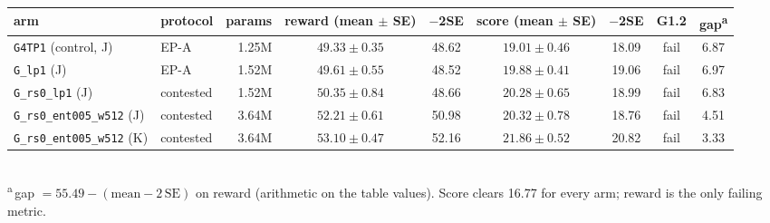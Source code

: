 \documentclass[10pt,a4paper]{article}
\newcommand{\p}[1]{\texttt{\small #1}}
\begin{document}
\begin{center}\small
\begin{tabular}{@{}p{3.6cm}lrcccccc@{}}\toprule
arm & protocol & params & reward (mean $\pm$ SE) & $-$2SE & score (mean $\pm$ SE) & $-$2SE & G1.2 & gap\textsuperscript{a}\\\midrule
\p{G4TP1} (control, J) & EP-A & 1.25M & $49.33\pm0.35$ & 48.62 & $19.01\pm0.46$ & 18.09 & fail & 6.87\\
\p{G\_lp1} (J) & EP-A & 1.52M & $49.61\pm0.55$ & 48.52 & $19.88\pm0.41$ & 19.06 & fail & 6.97\\
\p{G\_rs0\_lp1} (J) & contested & 1.52M & $50.35\pm0.84$ & 48.66 & $20.28\pm0.65$ & 18.99 & fail & 6.83\\
\p{G\_rs0\_ent005\_w512} (J) & contested & 3.64M & $52.21\pm0.61$ & 50.98 & $20.32\pm0.78$ & 18.76 & fail & 4.51\\
\p{G\_rs0\_ent005\_w512} (K) & contested & 3.64M & $53.10\pm0.47$ & 52.16 & $21.86\pm0.52$ & 20.82 & fail & 3.33\\\bottomrule
\end{tabular}\\[2pt]
{\scriptsize \textsuperscript{a}\,gap $=55.49-(\text{mean}-2\,\text{SE})$ on reward (arithmetic on the table values). Score clears 16.77 for every arm; reward is the only failing metric.}
\end{center}
\end{document}
